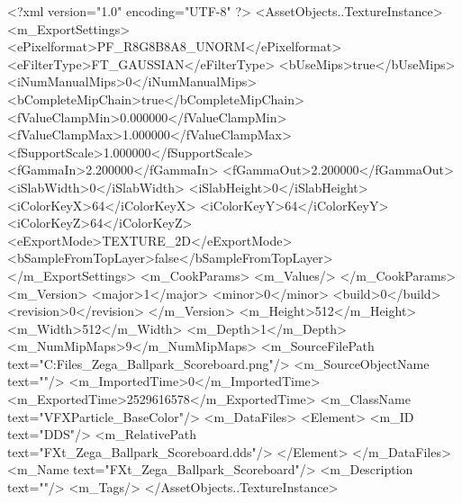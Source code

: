 <?xml version="1.0" encoding="UTF-8" ?>
<AssetObjects..TextureInstance>
	<m_ExportSettings>
		<ePixelformat>PF_R8G8B8A8_UNORM</ePixelformat>
		<eFilterType>FT_GAUSSIAN</eFilterType>
		<bUseMips>true</bUseMips>
		<iNumManualMips>0</iNumManualMips>
		<bCompleteMipChain>true</bCompleteMipChain>
		<fValueClampMin>0.000000</fValueClampMin>
		<fValueClampMax>1.000000</fValueClampMax>
		<fSupportScale>1.000000</fSupportScale>
		<fGammaIn>2.200000</fGammaIn>
		<fGammaOut>2.200000</fGammaOut>
		<iSlabWidth>0</iSlabWidth>
		<iSlabHeight>0</iSlabHeight>
		<iColorKeyX>64</iColorKeyX>
		<iColorKeyY>64</iColorKeyY>
		<iColorKeyZ>64</iColorKeyZ>
		<eExportMode>TEXTURE_2D</eExportMode>
		<bSampleFromTopLayer>false</bSampleFromTopLayer>
	</m_ExportSettings>
	<m_CookParams>
		<m_Values/>
	</m_CookParams>
	<m_Version>
		<major>1</major>
		<minor>0</minor>
		<build>0</build>
		<revision>0</revision>
	</m_Version>
	<m_Height>512</m_Height>
	<m_Width>512</m_Width>
	<m_Depth>1</m_Depth>
	<m_NumMipMaps>9</m_NumMipMaps>
	<m_SourceFilePath text="C:\Users\Shadow\Desktop\Working Files\Dropzone\FXt_Zega_Ballpark_Scoreboard.png"/>
	<m_SourceObjectName text=""/>
	<m_ImportedTime>0</m_ImportedTime>
	<m_ExportedTime>2529616578</m_ExportedTime>
	<m_ClassName text="VFXParticle_BaseColor"/>
	<m_DataFiles>
		<Element>
			<m_ID text="DDS"/>
			<m_RelativePath text="FXt_Zega_Ballpark_Scoreboard.dds"/>
		</Element>
	</m_DataFiles>
	<m_Name text="FXt_Zega_Ballpark_Scoreboard"/>
	<m_Description text=""/>
	<m_Tags/>
</AssetObjects..TextureInstance>

